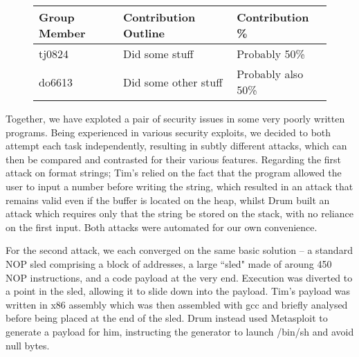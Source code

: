 \begin{figure}[h]
\centering
\begin{tabular}{|l|l|l|}
\hline
{\bf Group Member} & {\bf Contribution Outline} & {\bf Contribution \%} \\
\hline
tj0824 & Did some stuff & Probably 50\% \\
do6613 & Did some other stuff & Probably also 50\% \\
\hline
\end{tabular}
\end{figure}

Together, we have exploted a pair of security issues in some very poorly written programs. Being experienced in various
security exploits, we decided to both attempt each task independently, resulting in subtly different attacks, which can
then be compared and contrasted for their various features. Regarding the first attack on format strings; Tim's relied
on the fact that the program allowed the user to input a number before writing the string, which resulted in an attack
that remains valid even if the buffer is located on the heap, whilst Drum built an attack which requires only that the
string be stored on the stack, with no reliance on the first input. Both attacks were automated for our own
convenience.

For the second attack, we each converged on the same basic solution -- a standard NOP sled comprising a block of
addresses, a large ``sled" made of aroung 450 NOP instructions, and a code payload at the very end. Execution was
diverted to a point in the sled, allowing it to slide down into the payload. Tim's payload was written in x86 assembly
which was then assembled with gcc and briefly analysed before being placed at the end of the sled. Drum instead used
Metasploit to generate a payload for him, instructing the generator to launch /bin/sh and avoid null bytes.
